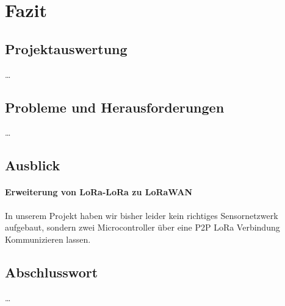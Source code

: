 
\chapter{Fazit} \label{Fazit}

\section{Projektauswertung} \label{Projektauswertung}

\ldots

\section{Probleme und Herausforderungen} \label{Probleme und Herausforderungen}

\ldots

\section{Ausblick} \label{Ausblick}

\subsubsection{Erweiterung von LoRa-LoRa zu LoRaWAN}

In unserem Projekt haben wir bisher leider kein richtiges Sensornetzwerk aufgebaut, sondern zwei Microcontroller über eine P2P LoRa Verbindung Kommunizieren lassen.

\section{Abschlusswort} \label{Abschlusswort}

\ldots

